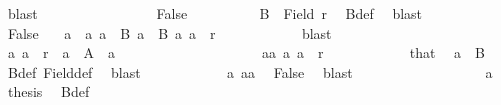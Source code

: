 \begin{isabellebody}
\ blast\isanewline
\ \ \ \ \ \ \isamarkupfalse%
\isanewline
\ \ \ \ \ \ \ \ \isamarkupfalse%
\ False\isanewline
\ \ \ \ \ \ \ \ \isamarkupfalse%
\ {\isachardoublequoteopen}B\ {\isasymsubseteq}\ Field\ r{\isachardoublequoteclose}\ \isamarkupfalse%
\ B{\isacharunderscore}{\kern0pt}def\ \isamarkupfalse%
\ blast\isanewline
\ \ \ \ \ \ \ \ \isamarkupfalse%
\ False\ {\isacharasterisk}{\kern0pt}\ \isamarkupfalse%
\ a\ \ a{\isacharcolon}{\kern0pt}\ {\isachardoublequoteopen}a\ {\isasymin}\ B{\isachardoublequoteclose}\ {\isachardoublequoteopen}{\isasymforall}a{\isacharprime}{\kern0pt}\ {\isasymin}\ B{\isachardot}{\kern0pt}\ {\isacharparenleft}{\kern0pt}a{\isacharprime}{\kern0pt}{\isacharcomma}{\kern0pt}\ a{\isacharparenright}{\kern0pt}\ {\isasymnotin}\ r{\isachardoublequoteclose}\isanewline
\ \ \ \ \ \ \ \ \ \ \isamarkupfalse%
\ blast\isanewline
\ \ \ \ \ \ \ \ \isamarkupfalse%
\ {\isachardoublequoteopen}{\isacharparenleft}{\kern0pt}a{\isacharprime}{\kern0pt}{\isacharcomma}{\kern0pt}\ a{\isacharparenright}{\kern0pt}\ {\isasymnotin}\ r{\isachardoublequoteclose}\ \ {\isachardoublequoteopen}a{\isacharprime}{\kern0pt}\ {\isasymin}\ A{\isachardoublequoteclose}\ \ a{\isacharprime}{\kern0pt}\isanewline
\ \ \ \ \ \ \ \ \isamarkupfalse%
\isanewline
\ \ \ \ \ \ \ \ \ \ \isamarkupfalse%
\ a{\isacharprime}{\kern0pt}a{\isacharcolon}{\kern0pt}\ {\isachardoublequoteopen}{\isacharparenleft}{\kern0pt}a{\isacharprime}{\kern0pt}{\isacharcomma}{\kern0pt}\ a{\isacharparenright}{\kern0pt}\ {\isasymin}\ r{\isachardoublequoteclose}\isanewline
\ \ \ \ \ \ \ \ \ \ \isamarkupfalse%
\ that\ \isamarkupfalse%
\ {\isachardoublequoteopen}a{\isacharprime}{\kern0pt}\ {\isasymin}\ B{\isachardoublequoteclose}\ \isamarkupfalse%
\ B{\isacharunderscore}{\kern0pt}def\ Field{\isacharunderscore}{\kern0pt}def\ \isamarkupfalse%
\ blast\isanewline
\ \ \ \ \ \ \ \ \ \ \isamarkupfalse%
\ a\ a{\isacharprime}{\kern0pt}a\ \isamarkupfalse%
\ False\ \isamarkupfalse%
\ blast\isanewline
\ \ \ \ \ \ \ \ \isamarkupfalse%
\isanewline
\ \ \ \ \ \ \ \ \isamarkupfalse%
\ a\ \isamarkupfalse%
\ {\isacharquery}{\kern0pt}thesis\ \isamarkupfalse%
\ B{\isacharunderscore}{\kern0pt}def\ \isamarkupfalse%

\end{isabellebody}
